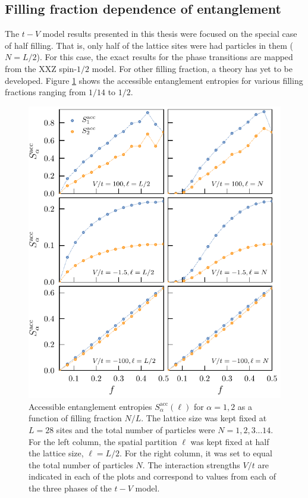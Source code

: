 	
	\subsection{Filling fraction dependence of entanglement}
	
	The $t-V$ model results presented in this thesis were focused on the special case of half filling. That is, only half of the lattice sites were had particles in them ($N = L/2$). For this case, the exact results for the phase transitions are mapped from the XXZ spin-$1/2$ model. For other filling fraction, a theory has yet to be developed. Figure \ref{fig:fillingFractionDependence} shows the accessible entanglement entropies for various filling fractions ranging from $1/14$ to $1/2$. 
	
	\begin{figure}[h!]
	\begin{center}
	\includegraphics[scale=1.0]{Images/fillingFractionDependence.pdf}
	\end{center}
	\caption{Accessible entanglement entropies $S_{\alpha}^{\mathrm{acc}}(\ell)$ for $		\alpha = 1,2$ as a function of filling fraction $N/L$. The lattice size was kept fixed at 		$L=28$ sites and the total number of particles were $N=1,2,3...14$. For the left column, 	the spatial partition $\ell$ was kept fixed at half the lattice size, $\ell = L/2$. For the right 	column, it was set to equal the total number of particles $N$. The interaction strengths 	$V/t$ are indicated in each of the plots and correspond to values from each of the three 	phases of the $t-V$ model.}
	\label{fig:fillingFractionDependence}
	\end{figure}
	
